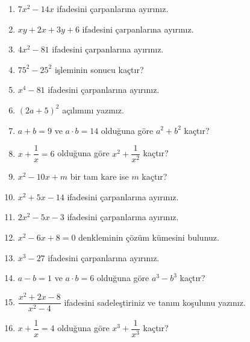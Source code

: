 \begin{enumerate}[label=\textbf{\arabic*.},leftmargin=*,itemsep=6pt]
\item \(7x^2-14x\) ifadesini çarpanlarına ayırınız.
\item \(xy+2x+3y+6\) ifadesini çarpanlarına ayırınız.
\item \(4x^2-81\) ifadesini çarpanlarına ayırınız.
\item \(75^2-25^2\) işleminin sonucu kaçtır?
\item \(x^4-81\) ifadesini çarpanlarına ayırınız.
\item \((2a+5)^2\) açılımını yazınız.
\item \(a+b=9\) ve \(a\cdot b=14\) olduğuna göre \(a^2+b^2\) kaçtır?
\item \(x+\dfrac{1}{x}=6\) olduğuna göre \(x^2+\dfrac{1}{x^2}\) kaçtır?
\item \(x^2-10x+m\) bir tam kare ise \(m\) kaçtır?
\item \(x^2+5x-14\) ifadesini çarpanlarına ayırınız.
\item \(2x^2-5x-3\) ifadesini çarpanlarına ayırınız.
\item \(x^2-6x+8=0\) denkleminin çözüm kümesini bulunuz.
\item \(x^3-27\) ifadesini çarpanlarına ayırınız.
\item \(a-b=1\) ve \(a\cdot b=6\) olduğuna göre \(a^3-b^3\) kaçtır?
\item \(\dfrac{x^2+2x-8}{x^2-4}\) ifadesini sadeleştiriniz ve tanım koşulunu yazınız.
\item \(x+\dfrac{1}{x}=4\) olduğuna göre \(x^3+\dfrac{1}{x^3}\) kaçtır?
\end{enumerate}

